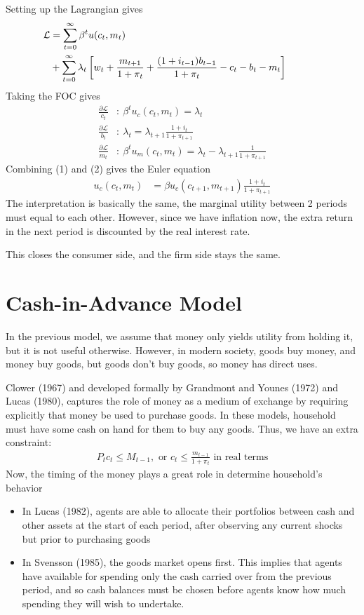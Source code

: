 \documentclass[twocolumn, fleqn]{article}
\begin{document}
	Setting up the Lagrangian gives
	\begin{align*}
	\hspace{-36pt}	\mathcal L &= \sum_{t=0}^{\infty} \beta^t u(c_t, m_t) \\
	\hspace{-36pt} &+ \sum_{t=0}^{\infty} \lambda_t \left[w_t + \frac{m_{t+1}}{1+\pi_t}+ \frac{(1+i_{t-1})b_{t-1}}{1+\pi_t}-c_t - b_t- m_t \right]
	\end{align*}
	Taking the FOC gives
	\begin{align}
		\frac{\partial \mathcal L}{c_t}&: \ \beta^t u_c(c_t, m_t)=\lambda_t\\
		\frac{\partial \mathcal L}{b_t}&: \ \lambda_t = \lambda_{t+1} \frac{1+i_t}{1+\pi_{t+1}}\\
		\frac{\partial \mathcal L}{m_t}&: \ \beta^t u_m(c_t, m_t) = \lambda_t - \lambda_{t+1} \frac{1}{1+\pi_{t+1}}
	\end{align}
	Combining (1) and (2) gives the Euler equation
	\begin{align*}
		u_c(c_t,m_t) &= \beta u_c (c_{t+1}, m_{t+1})\frac{1+i_t}{1+\pi_{t+1}}
	\end{align*}
	The interpretation is basically the same, the marginal utility between 2 periods must equal to each other. However, since we have inflation now, the extra return in the next period is discounted by the real interest rate. 
	
	This closes the consumer side, and the firm side stays the same.
	
	\section{Cash-in-Advance Model}
	In the previous model, we assume that money only yields utility from holding it, but it is not useful otherwise. However, in modern society, goods buy money, and money buy goods, but goods don't buy goods, so money has direct uses. 
	
	Clower (1967) and developed formally by Grandmont and Younes (1972) and Lucas (1980), captures the role of money as a medium of exchange by requiring explicitly that money be used to purchase goods. In these models, household must have some cash on hand for them to buy any goods. Thus, we have an extra constraint:
	\begin{align*}
		P_t c_t \leq M_{t-1}, \text{ or } c_t \leq \frac{m_{t-1}}{1+\pi_t} \text{ in real terms}
	\end{align*}
	Now, the timing of the money plays a great role in determine household's behavior
	\begin{itemize}
		\item In Lucas (1982), agents are able to allocate their portfolios between cash and other assets at the start of each period, after observing any current shocks but prior to purchasing goods
		\item In Svensson (1985), the goods market opens first. This implies that agents have available
			for spending only the cash carried over from the previous period, and so cash balances
			must be chosen before agents know how much spending they will wish to undertake.
	\end{itemize}
	
\end{document}
